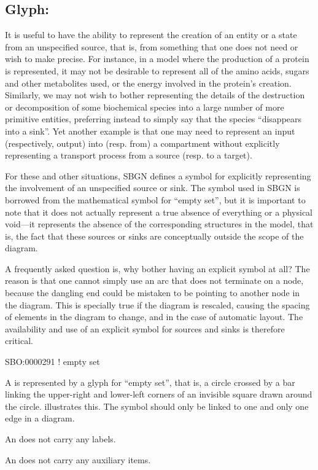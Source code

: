 
\color{red}

\subsection{Glyph: }
\label{sec:sourceSink}

It is useful to have the ability to represent the creation of an entity or
a state from an unspecified source, that is, from something that one does
not need or wish to make precise.  For instance, in a model where the
production of a protein is represented, it may not be desirable to
represent all of the amino acids, sugars and other metabolites used, or the
energy involved in the protein's creation.  Similarly, we may not wish to
bother representing the details of the destruction or decomposition of some
biochemical species into a large number of more primitive entities,
preferring instead to simply say that the species ``disappears into a
sink''.  Yet another example is that one may need to represent an input
(respectively, output) into (resp. from) a compartment without explicitly
representing a transport process from a source (resp. to a target).

For these and other situations, SBGN defines a symbol for explicitly
representing the involvement of an unspecified source or sink.  The symbol
used in SBGN is borrowed from the mathematical symbol for ``empty set'',
but it is important to note that it does not actually represent a true
absence of everything or a physical void---it represents the absence of the
corresponding structures in the model, that is, the fact that these sources
or sinks are conceptually outside the scope of the diagram.

A frequently asked question is, why bother having an explicit symbol at
all?  The reason is that one cannot simply use an arc that does not
terminate on a node, because the dangling end could be mistaken to be
pointing to another node in the diagram.  This is specially true if the
diagram is rescaled, causing the spacing of elements in the diagram to
change, and in the case of automatic layout.  The availability and use of an explicit symbol for sources and
sinks is therefore critical.

\begin{glyphDescription}

\glyphSboTerm SBO:0000291 ! empty set

\glyphContainer A  is represented by a glyph for ``empty
set'', that is, a circle crossed by a bar linking the upper-right and
lower-left corners of an invisible square drawn around the circle.
 illustrates this.  The symbol should only be linked to one
and only one edge in a diagram.

\glyphLabel An  does not carry any labels.

\glyphAux An  does not carry any auxiliary items.  

\end{glyphDescription}

